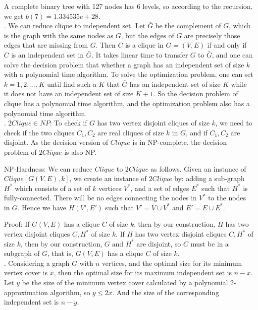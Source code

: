 \documentclass[11pt]{article} %
\begin{document}
A complete binary tree with 127 nodes has 6 levels, so according to the recursion, we get $b(7) = 1.334535e+28$.\\



. We can reduce clique to independent set. Let $\bar{G}$ be the complement of $G$, which is the graph with the same nodes as $G$, but the edges of $\bar{G}$ are precisely those edges that are missing from $G$. Then $C$ is a clique in $G = (V,E)$ if and only if $C$ is an independent set in $\bar{G}$. 
It takes linear time to transfer $G$ to $\bar{G}$, and one can solve the decision problem that whether a graph has an independent set of size $k$ with a polynomial time algorithm. To solve the optimization problem, one can set $k = 1, 2, …, K$ until find such a $K$ that  $\bar{G}$ has an independent set of size $K$ while it does not have an independent set of size $K+1$. So the decision problem of clique has a polynomial time algorithm, and the optimization problem also has a polynomial time algorithm. \\


. $2Clique \in NP$: To check if $G$ has two vertex disjoint cliques of size $k$, we need to check if the two cliques $C_1, C_2$ are real cliques of size $k$ in $G$, and if $C_1, C_2$ are disjoint. As the decision version of $Clique$ is in NP-complete, the decision problem of $2Clique$ is also NP.

NP-Hardness: We can reduce $Clique$ to $2Clique$ as follows. Given an instance of $Clique[G(V,E),k]$, we create an instance of $2Clique$ by: adding a sub-graph $H^*$ which consists of a set of $k$ vertices $V^*$, and a set of edges $E^*$ such that $H^*$ is fully-connected. There will be no edges connecting the nodes in $V^*$ to the nodes in $G$. Hence we have $H(V',E')$ such that $V' = V \cup V^*$ and $E' = E \cup E^*$. 

Proof:
If $G(V,E)$ has a clique $C$ of size $k$, then by our construction, $H$ has two vertex disjoint cliques $C, H^*$ of size $k$. 
If $H$ has two vertex disjoint cliques $C, H^*$ of size $k$, then by our construction, $G$ and $H^*$ are disjoint, so $C$ must be in a subgraph of $G$, that is, $G(V,E)$ has a clique $C$ of size $k$. \\



. Considering a graph $G$ with $n$ vertices, and the optimal size for its minimum vertex cover is $x$, then the optimal size for its maximum independent set is $n-x$. Let $y$ be the size of the minimum vertex cover calculated by a polynomial 2-approximation algorithm, so $y \leq 2x$. And the size of the corresponding independent set is $n-y$.
\end{document}
